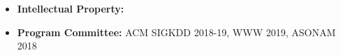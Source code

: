 
\begin{itemize}[nosep]
    \item {\bf Intellectual Property: } 
    \item {\bf Program Committee: } ACM SIGKDD 2018-19, WWW 2019, ASONAM 2018
\end{itemize}
